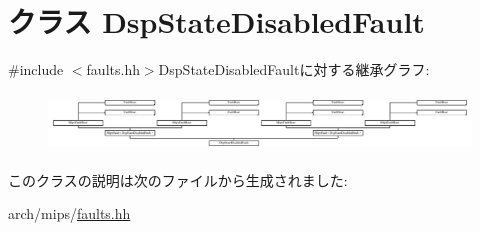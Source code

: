 \hypertarget{classMipsISA_1_1DspStateDisabledFault}{
\section{クラス DspStateDisabledFault}
\label{classMipsISA_1_1DspStateDisabledFault}
}


{\ttfamily \#include $<$faults.hh$>$}DspStateDisabledFaultに対する継承グラフ:\begin{figure}[H]
\begin{center}
\leavevmode
\includegraphics[height=1.54867cm]{classMipsISA_1_1DspStateDisabledFault}
\end{center}
\end{figure}


このクラスの説明は次のファイルから生成されました:\begin{DoxyCompactItemize}
\item 
arch/mips/\hyperlink{arch_2mips_2faults_8hh}{faults.hh}\end{DoxyCompactItemize}
